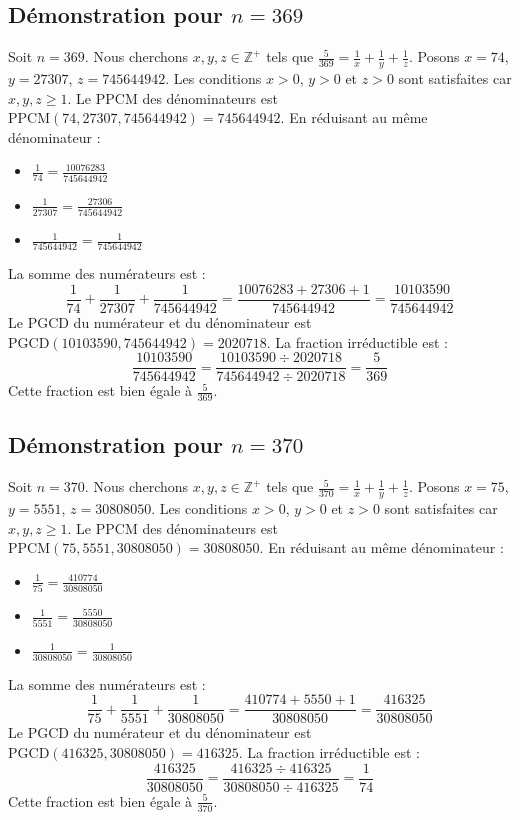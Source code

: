 \documentclass[11pt,a4paper]{article}
\begin{document}
\subsection{Démonstration pour $n = 369$}
Soit $n = 369$. Nous cherchons $x, y, z \in \mathbb{Z}^{+}$ tels que $\frac{5}{369} = \frac{1}{x} + \frac{1}{y} + \frac{1}{z}$.
Posons $x = 74$, $y = 27307$, $z = 745644942$.
Les conditions $x > 0$, $y > 0$ et $z > 0$ sont satisfaites car $x, y, z \geq 1$.
Le PPCM des dénominateurs est $\text{PPCM}(74, 27307, 745644942) = 745644942$.
En réduisant au même dénominateur :
\begin{itemize}
    \item $\frac{1}{74} = \frac{10076283}{745644942}$
    \item $\frac{1}{27307} = \frac{27306}{745644942}$
    \item $\frac{1}{745644942} = \frac{1}{745644942}$
\end{itemize}
La somme des numérateurs est :
$$ \frac{1}{74} + \frac{1}{27307} + \frac{1}{745644942} = \frac{10076283 + 27306 + 1}{745644942} = \frac{10103590}{745644942} $$
Le PGCD du numérateur et du dénominateur est $\text{PGCD}(10103590, 745644942) = 2020718$.
La fraction irréductible est :
$$ \frac{10103590}{745644942} = \frac{10103590 \div 2020718}{745644942 \div 2020718} = \frac{5}{369} $$
Cette fraction est bien égale à $\frac{5}{369}$.

\subsection{Démonstration pour $n = 370$}
Soit $n = 370$. Nous cherchons $x, y, z \in \mathbb{Z}^{+}$ tels que $\frac{5}{370} = \frac{1}{x} + \frac{1}{y} + \frac{1}{z}$.
Posons $x = 75$, $y = 5551$, $z = 30808050$.
Les conditions $x > 0$, $y > 0$ et $z > 0$ sont satisfaites car $x, y, z \geq 1$.
Le PPCM des dénominateurs est $\text{PPCM}(75, 5551, 30808050) = 30808050$.
En réduisant au même dénominateur :
\begin{itemize}
    \item $\frac{1}{75} = \frac{410774}{30808050}$
    \item $\frac{1}{5551} = \frac{5550}{30808050}$
    \item $\frac{1}{30808050} = \frac{1}{30808050}$
\end{itemize}
La somme des numérateurs est :
$$ \frac{1}{75} + \frac{1}{5551} + \frac{1}{30808050} = \frac{410774 + 5550 + 1}{30808050} = \frac{416325}{30808050} $$
Le PGCD du numérateur et du dénominateur est $\text{PGCD}(416325, 30808050) = 416325$.
La fraction irréductible est :
$$ \frac{416325}{30808050} = \frac{416325 \div 416325}{30808050 \div 416325} = \frac{1}{74} $$
Cette fraction est bien égale à $\frac{5}{370}$.
\end{document}
